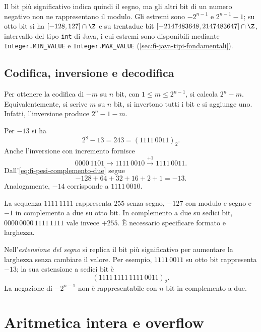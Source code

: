 Il bit più significativo indica quindi il segno, ma gli altri bit di
un numero negativo non ne rappresentano il modulo. Gli estremi
sono \(-2^{n-1}\) e \(2^{n-1}-1\); su otto bit si ha
\([-128,127]\cap\Z\) e su trentadue bit
\([-2147483648,2147483647]\cap\Z\), intervallo del tipo
\texttt{int} di Java, i cui estremi sono disponibili mediante
\texttt{Integer.MIN\_VALUE} e \texttt{Integer.MAX\_VALUE}
(\cref{sec:fi-java-tipi-fondamentali}).

\subsection{Codifica, inversione e decodifica}

Per ottenere la codifica di \(-m\) su \(n\) bit, con
\(1\le m\le2^{n-1}\), si calcola \(2^n-m\). Equivalentemente, si
scrive \(m\) su \(n\) bit, si invertono tutti i bit e si aggiunge uno.
Infatti, l'inversione produce \(2^n-1-m\).

\begin{example}
Per \(-13\) si ha
\[
  2^8-13=243=(1111\,0011)_2.
\]
Anche l'inversione con incremento fornisce
\[
  0000\,1101\longrightarrow1111\,0010
  \xrightarrow{+1}1111\,0011.
\]
Dall'\cref{eq:fi-pesi-complemento-due} segue
\[
  -128+64+32+16+2+1=-13.
\]
Analogamente, \(-14\) corrisponde a \(1111\,0010\).
\end{example}

\begin{warning}
\label{warn:fi-larghezza-interi}
La sequenza \(1111\,1111\) rappresenta \(255\) senza segno, \(-127\)
con modulo e segno e \(-1\) in complemento a due su otto bit. In
complemento a due su sedici bit, \(0000\,0000\,1111\,1111\) vale
invece \(+255\). È necessario specificare formato e larghezza.
\end{warning}

Nell'\emph{estensione del segno} si replica il bit più significativo
per aumentare la larghezza senza cambiare il valore. Per esempio,
\(1111\,0011\) su otto bit rappresenta \(-13\); la sua estensione
a sedici bit è
\[
  (1111\,1111\,1111\,0011)_2.
\]
La negazione di \(-2^{n-1}\) non è rappresentabile con \(n\)
bit in complemento a due.

\section{Aritmetica intera e overflow}
\label{sec:fi-aritmetica-overflow}

